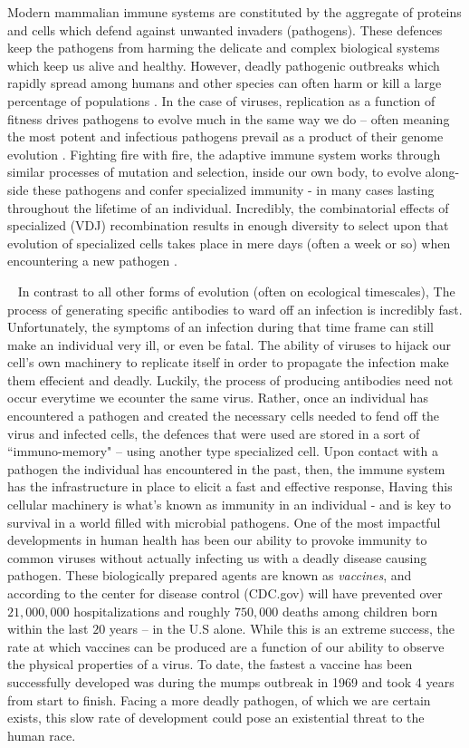 \documentclass{article}
\begin{document}
Modern mammalian immune systems are constituted by the aggregate of proteins and cells which
defend against unwanted invaders (pathogens).
These defences keep the pathogens from harming the delicate and complex biological systems which keep us alive and healthy.
However, deadly pathogenic outbreaks which rapidly spread among humans and other species can often harm or kill a large percentage of populations \citep{Wu2020}.
In the case of viruses, replication as a function of fitness drives pathogens to evolve much in the same way we do --
often meaning the most potent and infectious pathogens prevail as a product of their genome evolution \citep{Twiddy2003, Felsenstein1981-zs}.
Fighting fire with fire, the adaptive immune system works through similar processes of mutation and selection, inside our own body,
to evolve along-side these pathogens and confer specialized immunity - in many cases lasting throughout the lifetime of an individual.
Incredibly, the combinatorial effects of specialized (VDJ) recombination results in enough diversity to select upon that evolution of specialized cells
takes place in mere days (often a week or so) when encountering a new pathogen \citep{Jung2004}.

~
In contrast to all other forms of evolution (often on ecological timescales), 
The process of generating specific antibodies to ward off an infection is incredibly fast.
Unfortunately, the symptoms of an infection during that time frame can still make an individual very ill, or even be fatal.
The ability of viruses to hijack our cell's own machinery to replicate itself in order to propagate the infection make them effecient and deadly.
Luckily, the process of producing antibodies need not occur everytime we ecounter the same virus.
Rather, once an individual has encountered a pathogen and created the necessary cells needed to fend off the virus and infected cells,
the defences that were used are stored in a sort of ``immuno-memory" -- using another type specialized cell.
Upon contact with a pathogen the individual has encountered in the past, then,
the immune system has the infrastructure in place to elicit a fast and effective response, 
Having this cellular machinery is what's known as immunity in an individual - and is key to survival in a world filled with microbial pathogens.
One of the most impactful developments in human health has been our ability to provoke immunity to common
viruses without actually infecting us with a deadly disease causing pathogen.
These biologically prepared agents are known as \textit{vaccines}, 
and according to the center for disease control (CDC.gov) will have prevented over $21,000,000$ hospitalizations and roughly $750,000$
deaths among children born within the last $20$ years -- in the U.S alone.
While this is an extreme success, the rate at which vaccines can be produced are a function of our ability to observe the physical properties of a virus.
To date, the fastest a vaccine has been successfully developed was during the mumps outbreak in 1969 and took 4 years from start to finish.
Facing a more deadly pathogen, of which we are certain exists, this slow rate of development could pose an existential threat to the human race.
\end{document}

